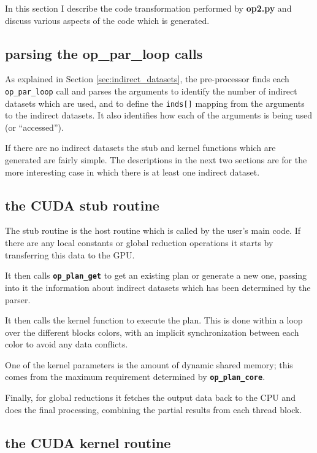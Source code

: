 \documentclass[11pt]{article}
\begin{document}
In this section I describe the code transformation performed by
{\bf op2.py} and discuss various aspects of the code which is generated.

\subsection{parsing the op\_par\_loop calls}

As explained in Section \ref{sec:indirect_datasets}, the pre-processor
finds each {\tt op\_par\_loop} call
and parses the arguments to identify the number of indirect
datasets which are used, and to define the {\tt inds[]} mapping
from the arguments to the indirect datasets.  It also identifies
how each of the arguments is being used (or ``accessed'').

If there are no indirect datasets the stub and kernel functions
which are generated are fairly simple.  The descriptions in the next
two sections are for the more interesting case in which there is
at least one indirect dataset.

\subsection{the CUDA stub routine}

The stub routine is the host routine which is called by the user's
main code.  If there are any local constants or global reduction
operations it starts by transferring this data to the GPU.

It then calls {\tt \bf op\_plan\_get} to get an existing plan or
generate a new one, passing into it the information about indirect
datasets which has been determined by the parser.

It then calls the kernel function to execute the plan.  This is
done within a loop over the different blocks colors, with an
implicit synchronization between each color to avoid any data
conflicts.

One of the kernel parameters is the amount of dynamic shared
memory; this comes from the maximum requirement determined
by {\tt \bf op\_plan\_core}.

Finally, for global reductions it fetches the output data back
to the CPU and does the final processing, combining the partial
results from each thread block.


\subsection{the CUDA kernel routine}
\end{document}

